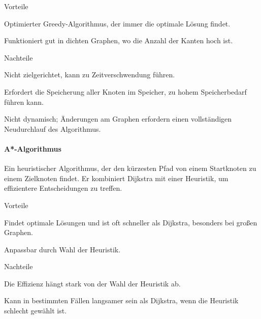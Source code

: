 \begin{minipage}[t]{0.48\textwidth}
\begin{items}
  \item [Vorteile]
  \item Optimierter Greedy-Algorithmus, der immer die optimale Lösung findet.
  \item Funktioniert gut in dichten Graphen, wo die Anzahl der Kanten hoch ist.
\end{items}
\end{minipage}
\hfill
\begin{minipage}[t]{0.48\textwidth}
\begin{items}
  \item [Nachteile]
  \item Nicht zielgerichtet, kann zu Zeitverschwendung führen.
  \item Erfordert die Speicherung aller Knoten im Speicher, zu hohem Speicherbedarf führen kann.
  \item Nicht dynamisch; Änderungen am Graphen erfordern einen vollständigen Neudurchlauf des Algorithmus.
\end{items}
\end{minipage}
\paragraph{A*-Algorithmus}

Ein heuristischer Algorithmus, der den kürzesten Pfad von einem Startknoten zu einem Zielknoten findet. Er kombiniert Dijkstra mit einer Heuristik, um effizientere Entscheidungen zu treffen.

\begin{minipage}[t]{0.48\textwidth}
\begin{items}
  \item [Vorteile]
  \item Findet optimale Lösungen und ist oft schneller als Dijkstra, besonders bei großen Graphen.
  \item Anpassbar durch Wahl der Heuristik.
\end{items}
\end{minipage}
\hfill
\begin{minipage}[t]{0.48\textwidth}
\begin{items}
  \item [Nachteile]
  \item Die Effizienz hängt stark von der Wahl der Heuristik ab.
  \item Kann in bestimmten Fällen langsamer sein als Dijkstra, wenn die Heuristik schlecht gewählt ist.
\end{items}
\end{minipage}

